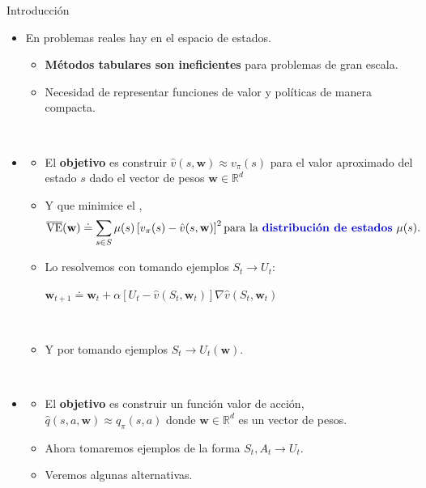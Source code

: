 \documentclass[10pt, envcountsect, handout, aspectratio=1610, hyperref={hypertexnames=true}]{beamer}
\begin{document}
\begin{frame}{Introducción}
	
	\begin{itemize}
		\item En problemas reales hay  en el espacio de estados.
			\begin{itemize}
				\item \textbf{Métodos tabulares son ineficientes} para problemas de gran escala.
				\item Necesidad de representar funciones de valor y políticas de manera compacta.
			\end{itemize}
			
		~
		
		\item {}
			\begin{itemize}
				\item El \textbf{objetivo} es construir $\hat{v}(s, \mathbf{w}) \approx v_\pi(s)$ para el valor aproximado del estado $s$ dado el vector de pesos $\mathbf{w}\in \mathbb{R}^d$
				
				\item Y que minimice el ,
					$$
				\overline{\text{VE}}(\mathbf{w}) \doteq \sum_{s \in S} \mu(s) \left[ v_\pi(s) - \hat{v}(s, \mathbf{w}) \right]^2
				     \text{\color{black} para la \key{distribución de estados} } \mu(s).$$
				     
    			\item Lo resolvemos con   tomando ejemplos $S_t \rightarrow U_t$:
				    
				    \centerline{$
				    	\mathbf{w}_{t+1} \doteq \mathbf{w}_t + \alpha \left[ U_t - \hat{v}(S_t, \mathbf{w}_t) \right] \nabla \hat{v}(S_t, \mathbf{w}_t)
				    	$}
				
				~
				
				\item Y por   tomando ejemplos $S_t \rightarrow U_t(\mathbf{w})$.
%
			\end{itemize}
			
		~
		
		\item {}
		
			\begin{itemize}
				\item El \textbf{objetivo} es construir un función valor de acción, $\hat{q}(s, a,  \mathbf{w})  \approx q_\pi(s, a)$ donde $\mathbf{w} \in \mathbb{R}^d$ es un vector de pesos.

				\item Ahora tomaremos ejemplos de la forma $S_t, A_t \rightarrow U_t$.

				\item Veremos algunas alternativas.
			\end{itemize}
	
	\end{itemize}
	
\end{frame}
\end{document}
